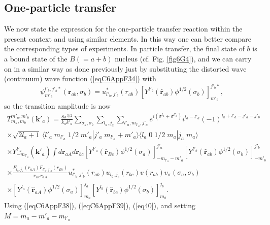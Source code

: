 \subsection{One-particle transfer}
We now state the expression for the one-particle transfer reaction within the present context and using similar elements. In this way one can better compare the corresponding types of experiments. In particle transfer, the final state of $b$ is a bound state of the $B(=a+b)$ nucleus (cf. Fig. \ref{fig6G4}), and we can carry on in a similar way as done previously just by substituting the distorted wave (continuum) wave function (\ref{eqC6AppF34}) with
 \begin{equation}\label{eqC6AppG57}
\psi_{m'_b}^{l'_b,j'_b*}(\mathbf{r}_{ab},\sigma_b)=u^*_{l'_b,j'_b}(r_{ab})\left[ Y^{l'_b} (\hat {\mathbf{r}}_{ab})\phi^{1/2}(\sigma_b)\right]^{j'_b*}_{m'_b},
\end{equation}
so the transition amplitude is now
\begin{multline}\label{eqC6AppG58}
T_{m_a,m_b}^{m'_a,m'_b}(\mathbf{k}'_a)=\frac{8\pi^{3/2}}{k_ak'_a}\sum_{\sigma_a,\sigma_b}\sum_{l_a,j_a}\sum_{l'_a,m_{l'_a},j'_a}
 e^{i(\sigma^{l_a}+\sigma^{l'_a})}i^{l_a-l'_a}(-1)^{l_a+l'_a-j'_a-j'_b}\\
\times \sqrt{2l_a+1}\,\langle l'_a\;m_{l'_a}\;1/2\;m'_a|j'_a\;m_{l'_a}+m'_a\rangle \langle l_a\;0\;1/2\;m_a|j_a\;m_a\rangle\\
\times Y^{l'_a}_{-m_{l'_a}} (\hat {\mathbf{k}}'_a)
\int d\mathbf{r}_{aA}d \mathbf{r}_{bc}\left[ Y^{l'_a} (\hat {\mathbf{r}}_{Bc})\phi^{1/2}(\sigma_a)\right]^{j'_a}_{-m_{l'_a}-m'_a}\left[ Y^{l'_b} (\hat {\mathbf{r}}_{ab})\phi^{1/2}(\sigma_b)\right]^{j'_b}_{-m'_b}\\
\times \frac{F_{l_a,j_a}(r_{aA})  F_{l'_a,j'_a}(r_{Bc})}{r_{Bc}r_{aA}}u^*_{l'_b,j'_b}(r_{ab})u_{l_b,j_b}(r_{bc})v(r_{ab})v_\sigma(\sigma_a,\sigma_b)\\
\times\left[ Y^{l_a} (\hat {\mathbf{r}}_{aA})\phi^{1/2}(\sigma_a)\right]^{j_a}_{m_a}\left[ Y^{l_b} (\hat {\mathbf{r}}_{bc})\phi^{1/2}(\sigma_b)\right]^{j_b}_{m_b}.
\end{multline}
Using (\ref{eqC6AppF38}), (\ref{eqC6AppF39}), (\ref{eq40}), and setting $M=m_a-m'_a-m_{l'_a}$
